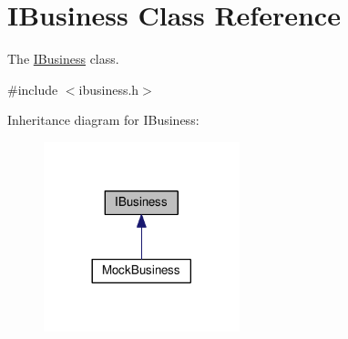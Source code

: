 \hypertarget{class_i_business}{}\section{I\+Business Class Reference}
\label{class_i_business}


The \hyperlink{class_i_business}{I\+Business} class.  




{\ttfamily \#include $<$ibusiness.\+h$>$}



Inheritance diagram for I\+Business\+:
\nopagebreak
\begin{figure}[H]
\begin{center}
\leavevmode
\includegraphics[width=161pt]{class_i_business__inherit__graph}
\end{center}
\end{figure}
